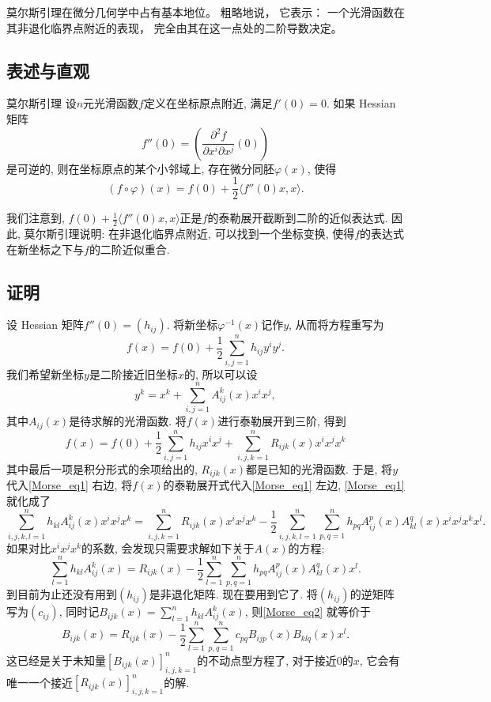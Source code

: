 
\begin{issues}
\issueTODO
\issueDraft
\end{issues}


莫尔斯引理在微分几何学中占有基本地位。 粗略地说， 它表示： 一个光滑函数在其非退化临界点附近的表现， 完全由其在这一点处的二阶导数决定。

\subsection{表述与直观}
\begin{lemma}{莫尔斯引理}
设$n$元光滑函数$f$定义在坐标原点附近, 满足$f'(0)=0$. 如果 Hessian 矩阵
$$
f''(0)=\left(\frac{\partial^2f}{\partial x^i\partial x^j}(0)\right)
$$
是可逆的, 则在坐标原点的某个小邻域上, 存在微分同胚$\varphi(x)$, 使得
$$
(f\circ\varphi)(x)=f(0)+\frac{1}{2}\langle f''(0)x,x\rangle.
$$
\end{lemma}

我们注意到, $f(0)+\frac{1}{2}\langle f''(0)x,x\rangle$正是$f$的泰勒展开截断到二阶的近似表达式. 因此, 莫尔斯引理说明: 在非退化临界点附近, 可以找到一个坐标变换, 使得$f$的表达式在新坐标之下与$f$的二阶近似重合.

\subsection{证明}
设 Hessian 矩阵$f''(0)=(h_{ij})$. 将新坐标$\varphi^{-1}(x)$记作$y$, 从而将方程重写为
\begin{equation}\label{Morse_eq1}
f(x)=f(0)+\frac{1}{2}\sum_{i,j=1}^nh_{ij}y^iy^j.
\end{equation}
我们希望新坐标$y$是二阶接近旧坐标$x$的, 所以可以设
$$
y^k
=x^k+\sum_{i,j=1}^nA^k_{ij}(x)x^ix^j,
$$
其中$A_{ij}(x)$是待求解的光滑函数. 将$f(x)$进行泰勒展开到三阶, 得到
$$
f(x)=f(0)+\frac{1}{2}\sum_{i,j=1}^nh_{ij}x^ix^j+
\sum_{i,j,k=1}^nR_{ijk}(x)x^ix^jx^k
$$
其中最后一项是积分形式的余项给出的, $R_{ijk}(x)$都是已知的光滑函数. 于是, 将$y$代入\autoref{Morse_eq1} 右边, 将$f(x)$的泰勒展开式代入\autoref{Morse_eq1} 左边, \autoref{Morse_eq1} 就化成了
$$
\sum_{i,j,k,l=1}^nh_{kl}A^k_{ij}(x)x^ix^jx^k
=\sum_{i,j,k=1}^nR_{ijk}(x)x^ix^jx^k
-\frac{1}{2}\sum_{i,j,k,l=1}^n\sum_{p,q=1}^nh_{pq}A^p_{ij}(x)A^q_{kl}(x)x^ix^jx^kx^l.
$$
如果对比$x^ix^jx^k$的系数, 会发现只需要求解如下关于$A(x)$的方程:
\begin{equation}\label{Morse_eq2}
\sum_{l=1}^nh_{kl}A^k_{ij}(x)
=R_{ijk}(x)
-\frac{1}{2}\sum_{l=1}^n\sum_{p,q=1}^nh_{pq}A^p_{ij}(x)A^q_{kl}(x)x^l.
\end{equation}
到目前为止还没有用到$(h_{ij})$是非退化矩阵. 现在要用到它了. 将$(h_{ij})$的逆矩阵写为$(c_{ij})$, 同时记$B_{ijk}(x)=\sum_{l=1}^nh_{kl}A^k_{ij}(x)$, 则\autoref{Morse_eq2} 就等价于
$$
B_{ijk}(x)
=R_{ijk}(x)-\frac{1}{2}\sum_{l=1}^n\sum_{p,q=1}^nc_{pq}B_{ijp}(x)B_{klq}(x)x^l.
$$
这已经是关于未知量$[B_{ijk}(x)]_{i,j,k=1}^n$的不动点型方程了, 对于接近$0$的$x$, 它会有唯一一个接近$[R_{ijk}(x)]_{i,j,k=1}^n$的解. 